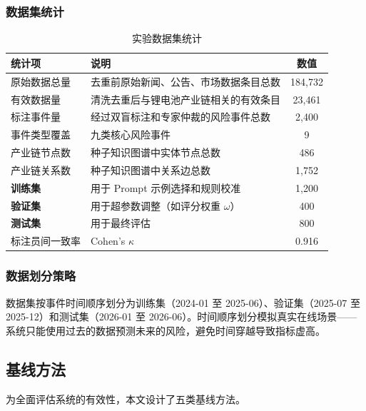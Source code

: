 \subsubsection{数据集统计}

\begin{table}[H]
\centering
\caption{实验数据集统计}
\label{tab:dataset-stats}
\begin{tabularx}{0.95\linewidth}{l X c}
\toprule
\textbf{统计项} & \textbf{说明} & \textbf{数值} \\
\midrule
原始数据总量 & 去重前原始新闻、公告、市场数据条目总数 & 184,732 \\
有效数据量 & 清洗去重后与锂电池产业链相关的有效条目 & 23,461 \\
标注事件量 & 经过双盲标注和专家仲裁的风险事件总数 & 2,400 \\
事件类型覆盖 & 九类核心风险事件 & 9 \\
产业链节点数 & 种子知识图谱中实体节点总数 & 486 \\
产业链关系数 & 种子知识图谱中关系边总数 & 1,752 \\
\textbf{训练集} & 用于 Prompt 示例选择和规则校准 & 1,200 \\
\textbf{验证集} & 用于超参数调整（如评分权重 $\omega$） & 400 \\
\textbf{测试集} & 用于最终评估 & 800 \\
标注员间一致率 & Cohen's $\kappa$ & 0.916 \\
\bottomrule
\end{tabularx}
\end{table}

\subsubsection{数据划分策略}

数据集按事件时间顺序划分为训练集（2024-01 至 2025-06）、验证集（2025-07 至 2025-12）和测试集（2026-01 至 2026-06）。时间顺序划分模拟真实在线场景——系统只能使用过去的数据预测未来的风险，避免时间穿越导致指标虚高。

\subsection{基线方法}
\label{sec:exp-baseline}

为全面评估\projectshort 系统的有效性，本文设计了五类基线方法。

